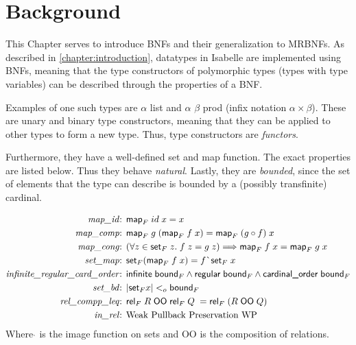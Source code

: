 
\chapter{Background}
\label{chapter:background}

  This Chapter serves to introduce \acp{BNF} and their generalization to \acp{MRBNF}. 
  As described in \autoref{chapter:introduction}, datatypes in Isabelle are implemented using \acp{BNF}, meaning that the type constructors of polymorphic types (types with type variables) can be described through the properties of a \ac{BNF}.

  Examples of one such types are \textsf{$\alpha$ list} and \textsf{$\alpha$ $\beta$ prod} (infix notation \textsf{$\alpha \times \beta$}). These are unary and binary type constructors, meaning that they can be applied to other types to form a new type. Thus, type constructors are \textit{functors}. 
  
  Furthermore, they have a well-defined set and map function. The exact properties are listed below.
  Thus they behave \textit{natural}. Lastly, they are \textit{bounded}, since the set of elements that the type can describe is bounded by a (possibly transfinite) cardinal.

  \begin{align}
    \text{\textit{map\_id}: }& \text{\textsf{map}}_F\; id\; x = x\\
    \text{\textit{map\_comp}: }& \text{\textsf{map}}_F\; g\; (\text{\textsf{map}}_F\; f\; x) = \text{\textsf{map}}_F\; (g \circ f)\; x\\
    \text{\textit{map\_cong}: }& (\forall z \in \text{\textsf{set}}_F\; z.\; f\; z = g\; z) \Longrightarrow 
      \text{\textsf{map}}_F\; f\; x = \text{\textsf{map}}_F\; g\; x\\
    \text{\textit{set\_map}: }& \text{\textsf{set}}_F (\text{\textsf{map}}_F\; f\; x) = f\; \grave{}\; \text{\textsf{set}}_F\; x\\
    \text{\textit{infinite\_regular\_card\_order}: }& \text{\textsf{infinite}}\; \text{\textsf{bound}}_F \land 
      \text{\textsf{regular}}\; \text{\textsf{bound}}_F \land 
      \text{\textsf{cardinal\_order}}\; \text{\textsf{bound}}_F\\
    \text{\textit{set\_bd}: }& | \text{\textsf{set}}_F x | <_o \text{\textsf{bound}}_F\\
    \text{\textit{rel\_compp\_leq}: }& \text{\textsf{rel}}_F\; R\; \text{\textsf{OO}}\; \text{\textsf{rel}}_F\; Q\; = 
      \text{\textsf{rel}}_F\; (R\; \text{\textsf{OO}}\; Q)\\
    \text{\textit{in\_rel}: }& \text{Weak Pullback Preservation WP}
  \end{align}
  Where $\grave{}$ is the image function on sets and \textsf{OO} is the composition of relations. %

